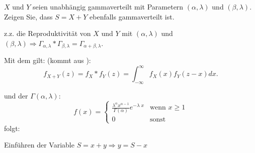 \begin{uebsp}
\begin{Exercise}[label=ex:3.1]
$X$ und $Y$ seien unabhängig gammaverteilt mit Parametern $(\alpha, \lambda)$ und
$(\beta, \lambda)$. Zeigen Sie, dass $S = X + Y$ ebenfalls gammaverteilt ist.
\end{Exercise}
\begin{Answer}
z.z. die Reproduktivität von $X$ und $Y$ mit $(\alpha, \lambda)$ und $(\beta, \lambda)\Rightarrow \Gamma_{\alpha,\lambda}*\Gamma_{\beta,\lambda}=\Gamma_{\alpha+\beta,\lambda}$.
\begin{uebsp_theory}
    Mit dem  gilt: (kommt aus ):
    \[f_{X+Y}(z)=f_X*f_Y(z)=\int_{-\infty}^{\infty} f_X(x)f_Y(z-x)dx.\]
\end{uebsp_theory}

\begin{uebsp_theory}
    und der  $\Gamma(\alpha, \lambda)$:
        \[f(x) = \begin{cases} 
                    \frac{\lambda^\alpha x^{\alpha-1}}{\Gamma(\alpha)}e^{-\lambda\; x} &\mbox{wenn } x \geq 1 \\
                    0 & \mbox{sonst}
            \end{cases}\]
    folgt:
\end{uebsp_theory}

Einführen der Variable $S=x+y\Rightarrow y=S-x$


\end{Answer}
\end{uebsp}
